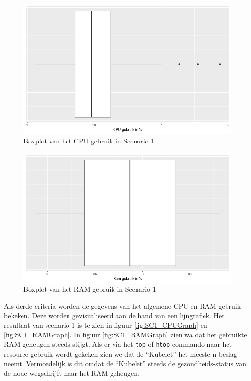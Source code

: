 %
\begin{figure}[h]
	\centering
	\includegraphics[width=0.75\linewidth]{img/SC1_CPUBox.png}
	\caption{Boxplot van het CPU gebruik in Scenario 1}
	\label{fig:SC1_CPUBox}
\end{figure}

\begin{figure}[h]
	\centering
	\includegraphics[width=0.75\linewidth]{img/SC1_RAMBox.png}
	\caption{Boxplot van het RAM gebruik in Scenario 1}
	\label{fig:SC1_RAMBox}
\end{figure}

Als derde criteria worden de gegevens van het algemene CPU en RAM gebruik bekeken. Deze worden gevisualiseerd aan de hand van een lijngrafiek. Het resultaat van scenario 1 is te zien in figuur \ref{fig:SC1_CPUGraph} en \ref{fig:SC1_RAMGraph}. In figuur \ref{fig:SC1_RAMGraph} zien wa dat het gebruikte RAM geheugen steeds stijgt. Als er via het \verb|top| of \verb|htop| commando naar het resource gebruik wordt gekeken zien we dat de ``Kubelet'' het meeste n beslag neemt. Vermoedelijk is dit omdat de ``Kubelet'' steeds de gezondheids-status van de node wegschrijft naar het RAM geheugen.

